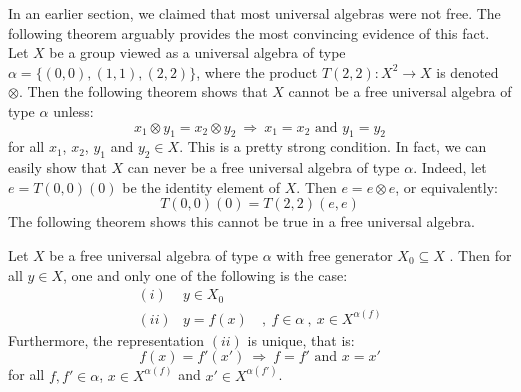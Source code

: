 In an earlier section, we claimed that most universal algebras were
not free. The following theorem arguably provides the most
convincing evidence of this fact. Let $X$ be a group viewed as a
universal algebra of type $\alpha=\{(0,0),(1,1),(2,2)\}$, where the
product $T(2,2):X^{2}\to X$ is denoted $\otimes$. Then the following
theorem shows that $X$ cannot be a free universal algebra of type
$\alpha$ unless:
    \[
    x_{1}\otimes y_{1} = x_{2}\otimes y_{2}\ \Rightarrow\ x_{1}=x_{2}\mbox{\ and\ }y_{1}=y_{2}
    \]
for all $x_{1}$, $x_{2}$, $y_{1}$ and $y_{2}\in X$. This is a pretty
strong condition. In fact, we can easily show that $X$ can never be
a free universal algebra of type $\alpha$. Indeed, let $e=T(0,0)(0)$
be the identity element of $X$. Then $e = e\otimes e$, or
equivalently:
    \[
    T(0,0)(0) = T(2,2)(e,e)
    \]
The following theorem shows this cannot be true in a free universal
algebra.
\begin{theorem}\label{logic:the:unique:representation}
Let $X$ be a free universal algebra of type $\alpha$ with free
generator $X_{0}\subseteq X$ . Then for all $y\in X$, one and only
one of the following is the case:
    \begin{eqnarray*}
    (i)&y\in X_{0}&\\
    (ii)&y=f(x)&\ ,\ f\in\alpha\ ,\ x\in X^{\alpha(f)}
    \end{eqnarray*}
Furthermore, the representation $(ii)$ is unique, that is:
    \[
    f(x)=f'(x')\ \Rightarrow\ f=f'\mbox{\ and\ }x=x'
    \]
for all $f,f'\in\alpha$, $x\in X^{\alpha(f)}$ and $x'\in X^{\alpha(f')}$.
\end{theorem}
